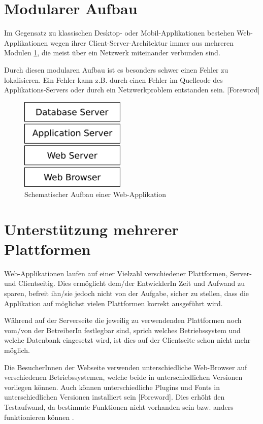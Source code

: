 \documentclass[a4paper,bibtotoc,oneside]{scrbook}
\begin{document}
\section{Modularer Aufbau}

Im Gegensatz zu klassischen Desktop- oder Mobil-Applikationen bestehen Web-Applikationen wegen ihrer Client-Server-Architektur immer aus mehreren Modulen \ref{Abb4}, die meist über ein Netzwerk miteinander verbunden sind.

Durch diesen modularen Aufbau ist es besonders schwer einen Fehler zu lokalisieren. Ein Fehler kann z.B. durch einen Fehler im Quellcode des Applikations-Servers oder durch ein Netzwerkproblem entstanden sein. \cite{testing_apps_on_web}[Foreword]

\begin{figure}[h!]
\centering
\includegraphics[width=50mm]{img/webstack.png}
\caption[Schematischer Aufbau einer Web-Applikation]{Schematischer Aufbau einer Web-Applikation}\label{Abb4}
\end{figure}

\section{Unterstützung mehrerer Plattformen}
Web-Applikationen laufen auf einer Vielzahl verschiedener Plattformen, Server- und Clientseitig. Dies ermöglicht dem/der EntwicklerIn Zeit und Aufwand zu sparen, befreit ihn/sie jedoch nicht von der Aufgabe, sicher zu stellen, dass die Applikation auf möglichst vielen Plattformen korrekt ausgeführt wird.

Während auf der Serverseite die jeweilig zu verwendenden Plattformen noch vom/von der BetreiberIn festlegbar sind, sprich welches Betriebssystem und welche Datenbank eingesetzt wird, ist dies auf der Clientseite schon nicht mehr möglich. 

Die BesucherInnen der Webseite verwenden unterschiedliche Web-Browser auf verschiedenen Betriebssystemen, welche beide in unterschiedlichen Versionen vorliegen können. Auch können unterschiedliche Plugins und Fonts in unterschiedlichen Versionen installiert sein \cite{testing_apps_on_web}[Foreword]. Dies erhöht den Testaufwand, da bestimmte Funktionen nicht vorhanden sein bzw. anders funktionieren können \cite{caniuse}.
\end{document}

